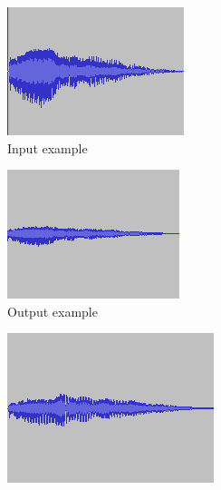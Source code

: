 \begin{figure}
\centering
\begin{subfigure}{.32\linewidth}
  \centering
  \includegraphics[width=.9\textwidth]{figs/original.png}
  \caption{Input example}
  \label{fig:inEx}
\end{subfigure}%
\begin{subfigure}{.32\linewidth}
  \centering
  \includegraphics[width=.9\textwidth]{figs/lpf800.png}
  \caption{Output example}
  \label{fig:outEx}
\end{subfigure}
\begin{subfigure}{.32\linewidth}
  \centering
  \includegraphics[width=.9\textwidth]{figs/lpf1989.png}

\end{subfigure}
\end{figure}
